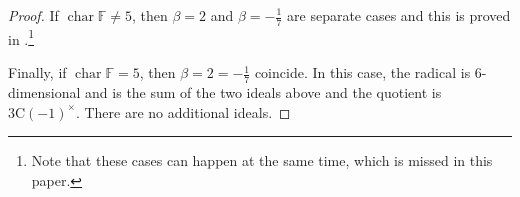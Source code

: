 \documentclass[11pt, a4paper]{article}
\theoremstyle{plain}
\theoremstyle{definition}
\newcommand\bt{\beta}
\newcommand\lm{\lambda}
\newcommand\la{\langle}
\newcommand\ra{\rangle}
\DeclareMathOperator{\ch}{char}
\DeclareMathOperator{\Ann}{Ann}
\newcommand\FF{\mathbb{F}}
\newcommand{\C}{\mathrm{C}}
\newcommand{\J}{\mathrm{J}}
\newcommand{\0}{\overline{0}}
\newcommand{\2}{\overline{2}}
\newcommand{\1}{\mathbbm{1}}
\begin{document}
\begin{proof}
If $\ch \FF \neq 5$, then $\bt = 2$ and $\bt = -\frac{1}{7}$ are separate cases and this is proved in \cite[Lemma 5.2]{2gen2btbt}.\footnote{Note that these cases can happen at the same time, which is missed in this paper.}

%
%
%

Finally, if $\ch \FF = 5$, then $\bt = 2 = -\frac{1}{7}$ coincide.  In this case, the radical is $6$-dimensional and is the sum of the two ideals above and the quotient is $3\C(-1)^\times$.  There are no additional ideals.
\end{proof}
\end{document}
